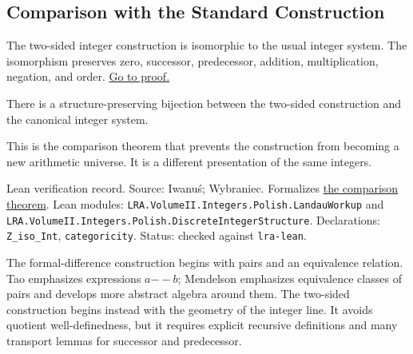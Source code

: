 \subsection*{Comparison with the Standard Construction}

\begin{theorem}
\label{thm:two-sided-integers-isomorphic-to-z}
The two-sided integer construction is isomorphic to the usual integer system.
The isomorphism preserves zero, successor, predecessor, addition,
multiplication, negation, and order.
\hyperref[prf:two-sided-integers-isomorphic-to-z]{Go to proof.}
\end{theorem}

\begin{remark*}
There is a structure-preserving bijection between the two-sided construction
and the canonical integer system.
\end{remark*}

\begin{remark*}[Interpretation]
This is the comparison theorem that prevents the construction from becoming a
new arithmetic universe. It is a different presentation of the same integers.
\end{remark*}

\begin{remark*}[Exposition]
Lean verification record. Source: Iwanu{\'s}; Wybraniec. Formalizes
\hyperref[thm:two-sided-integers-isomorphic-to-z]{the comparison theorem}.
Lean modules: \texttt{LRA.VolumeII.Integers.Polish.LandauWorkup} and
\texttt{LRA.VolumeII.Integers.Polish.DiscreteIntegerStructure}. Declarations:
\texttt{Z\_iso\_Int}, \texttt{categoricity}. Status: checked against
\texttt{lra-lean}.
\end{remark*}

\begin{remark*}[Exposition]
The formal-difference construction begins with pairs and an equivalence
relation. Tao emphasizes expressions \(a{--}b\); Mendelson emphasizes
equivalence classes of pairs and develops more abstract algebra around them.
The two-sided construction begins instead with the geometry of the integer
line. It avoids quotient well-definedness, but it requires explicit recursive
definitions and many transport lemmas for successor and predecessor.
\end{remark*}

